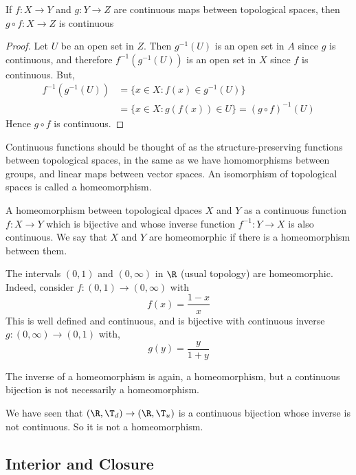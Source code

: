 \begin{nlemma}[]
  If $f : X \to Y$ and $g : Y \to Z$ are continuous maps between topological spaces, then $g \circ f : X \to Z$ is continuous
\end{nlemma}
\begin{proof}
  Let $U$ be an open set in $Z$. Then $g^{-1}(U)$ is an open set in $A$ since $g$ is continuous, and therefore $f^{-1}(g^{-1}(U))$ is an open set in $X$ since $f$ is continuous. But,
  \begin{align*}
    f^{-1}(g^{-1}(U)) &= \{x \in X : f(x) \in g^{-1}(U)\}\\
    &= \{ x \in X : g(f(x)) \in U\} = (g \circ f)^{-1}(U)
  \end{align*}
  Hence $g\circ f$ is continuous.
\end{proof}

Continuous functions should be thought of as the structure-preserving functions between topological spaces, in the same as we have homomorphisms between groups, and linear maps between vector spaces. An isomorphism of topological spaces is called a homeomorphism.

\begin{ndefi}[Homeomorphism]
  A homeomorphism between topological dpaces $X$ and $Y$ as a continuous function $f : X \to Y$ which is bijective and whose inverse function $f^{-1} : Y \to X$ is also continuous. We say that $X$ and $Y$ are homeomorphic if there is a homeomorphism between them.
\end{ndefi}

\begin{eg}
  The intervals $(0, 1)$ and $(0, \infty)$ in $\R$ (usual topology) are homeomorphic. Indeed, consider $f : (0,1) \to (0, \infty)$ with
  $$ f(x) = \frac{1 - x}{x} $$
  This is well defined and continuous, and is bijective with continuous inverse $g : (0, \infty) \to (0, 1)$ with,
  $$ g(y) = \frac{y}{1 + y} $$
\end{eg}
The inverse of a homeomorphism is again, a homeomorphism, but a continuous bijection is not necessarily a homeomorphism.

\begin{eg}
  We have seen that $(\R, \T_d) \to (\R, \T_u)$ is a continuous bijection whose inverse is not continuous. So it is not a homeomorphism.
\end{eg}

\subsection{Interior and Closure}

